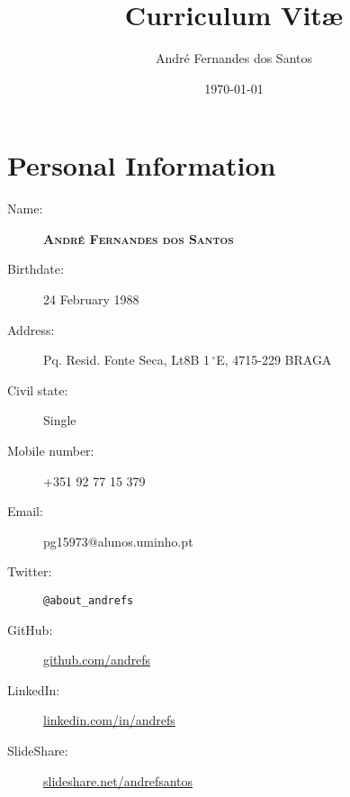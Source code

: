 \documentclass{article}
\author{André Fernandes dos Santos}
\title{Curriculum Vit\ae}
\date{\today}
\begin{document}
\maketitle
\thispagestyle{empty}

\newpage
\section{Personal Information}
	\begin{description}
	\item [Name:] \textbf{\textsc{André Fernandes dos Santos}}
	\item [Birthdate:] 24 February 1988
	\item [Address:] Pq. Resid. Fonte Seca, Lt8B 1$\,^{\circ}$E, 4715-229 BRAGA
	\item [Civil state:] Single
	\item [Mobile number:] +351 92 77 15 379
	\item [Email:] pg15973@alunos.uminho.pt
	\end{description}


	\vspace{.2cm}
	\begin{description}
		\item [Twitter:] \texttt{@about\_andrefs} 
		\item [GitHub:] \url{github.com/andrefs} 
		\item [LinkedIn:] \url{linkedin.com/in/andrefs}
		\item [SlideShare:] \url{slideshare.net/andrefsantos}
	\end{description}
\end{document}
